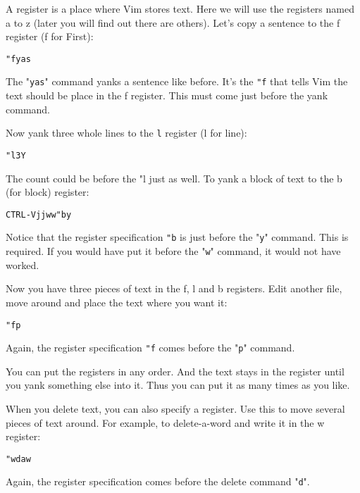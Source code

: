 A register is a place where Vim stores text.
Here we will use the registers named a to z (later you will find out there are others).
Let's copy a sentence to the f register (f for First):

 \begin{Verbatim}[samepage=true]
 "fyas
 \end{Verbatim}

The "\verb!yas!" command yanks a sentence like before.
It's the \verb!"f! that tells Vim the text should be place in the f register.
This must come just before the yank command.

Now yank three whole lines to the \verb:l: register (l for line):

 \begin{Verbatim}[samepage=true]
 "l3Y
 \end{Verbatim}

The count could be before the "l just as well.
To yank a block of text to the b (for block) register:

 \begin{Verbatim}[samepage=true]
 CTRL-Vjjww"by
 \end{Verbatim}

Notice that the register specification \verb!"b! is just before the "\verb!y!" command.
This is required.
If you would have put it before the "\verb!w!" command, it would not have worked.

Now you have three pieces of text in the f, l and b registers.
Edit another file, move around and place the text where you want it:

 \begin{Verbatim}[samepage=true]
 "fp
 \end{Verbatim}

Again, the register specification \verb!"f! comes before the "\verb!p!" command.

You can put the registers in any order.
And the text stays in the register until you yank something else into it.
Thus you can put it as many times as you like.

When you delete text, you can also specify a register.
Use this to move several pieces of text around.
For example, to delete-a-word and write it in the w register:

 \begin{Verbatim}[samepage=true]
 "wdaw
 \end{Verbatim}

Again, the register specification comes before the delete command "\verb!d!".

